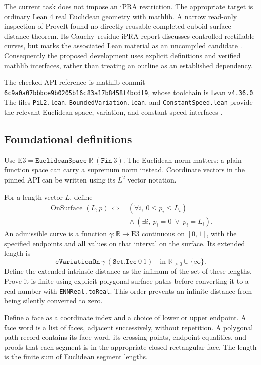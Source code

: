 \documentclass[11pt]{article}
\theoremstyle{definition}
\newcommand{\R}{\mathbb R}
\begin{document}
The current task does not impose an iPRA restriction. The appropriate
target is ordinary Lean 4 real Euclidean geometry with mathlib. A
narrow read-only inspection of ProveIt found no directly reusable
completed cuboid surface-distance theorem. Its Cauchy--residue iPRA
report discusses controlled rectifiable curves, but marks the associated
Lean material as an uncompiled candidate \cite{ProveIt}. Consequently
the proposed development uses explicit definitions and verified
mathlib interfaces, rather than treating an outline as an established
dependency.

The checked API reference is mathlib commit
\texttt{6c9a0a07bbbce9b0205b16c83a17b8458f4bcdf9},
whose toolchain is Lean \texttt{v4.36.0}.
The files \texttt{PiL2.lean}, \texttt{BoundedVariation.lean},
and \texttt{ConstantSpeed.lean} provide the relevant Euclidean-space,
variation, and constant-speed interfaces \cite{Mathlib}.

\subsection{Foundational definitions}

Use \(\mathrm{E3}=\texttt{EuclideanSpace}\ \R\ (\texttt{Fin}\ 3)\).
The Euclidean norm matters: a plain function space can carry a
supremum norm instead. Coordinate vectors in the pinned API can be
written using its \(L^2\) vector notation.

For a length vector \(L\), define
\[
\begin{split}
\operatorname{OnSurface}(L,p)\ \Longleftrightarrow\
&(\forall i,\ 0\le p_i\le L_i)\\
&{}\land(\exists i,\ p_i=0\ \lor\ p_i=L_i).
\end{split}
\]
An admissible curve is a function
\(\gamma:\R\to\mathrm{E3}\) continuous on \([0,1]\), with the
specified endpoints and all values on that interval on the surface.
Its extended length is
\[
\texttt{eVariationOn}\ \gamma\ (\texttt{Set.Icc}\ 0\ 1)
\quad\text{in }\R_{\ge0}\cup\{\infty\}.
\]
Define the extended intrinsic distance as the infimum of the set of
these lengths. Prove it is finite using explicit polygonal surface
paths before converting it to a real number with
\texttt{ENNReal.toReal}. This order prevents an infinite distance
from being silently converted to zero.

Define a face as a coordinate index and a choice of lower or upper
endpoint. A face word is a list of faces, adjacent successively,
without repetition. A polygonal path record contains its face word,
its crossing points, endpoint equalities, and proofs that each segment
is in the appropriate closed rectangular face. The length is the
finite sum of Euclidean segment lengths.
\end{document}
